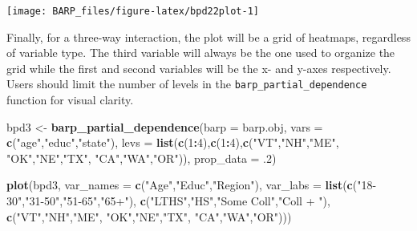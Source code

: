 \documentclass[]{article}
\newenvironment{Shaded}{\begin{snugshade}}{\end{snugshade}}
\newcommand{\KeywordTok}[1]{\textcolor[rgb]{0.13,0.29,0.53}{\textbf{#1}}}
\newcommand{\DataTypeTok}[1]{\textcolor[rgb]{0.13,0.29,0.53}{#1}}
\newcommand{\DecValTok}[1]{\textcolor[rgb]{0.00,0.00,0.81}{#1}}
\newcommand{\StringTok}[1]{\textcolor[rgb]{0.31,0.60,0.02}{#1}}
\newcommand{\OperatorTok}[1]{\textcolor[rgb]{0.81,0.36,0.00}{\textbf{#1}}}
\newcommand{\NormalTok}[1]{#1}
\begin{document}
\begin{center}\texttt{[image: BARP\_files/figure-latex/bpd22plot-1]} \end{center}

Finally, for a three-way interaction, the plot will be a grid of
heatmaps, regardless of variable type. The third variable will always be
the one used to organize the grid while the first and second variables
will be the x- and y-axes respectively. Users should limit the number of
levels in the \texttt{barp\_partial\_dependence} function for visual
clarity.

\begin{Shaded}
\begin{Highlighting}[]
\NormalTok{bpd3 <-}\StringTok{ }\KeywordTok{barp_partial_dependence}\NormalTok{(}\DataTypeTok{barp =}\NormalTok{ barp.obj,}
                               \DataTypeTok{vars =} \KeywordTok{c}\NormalTok{(}\StringTok{"age"}\NormalTok{,}\StringTok{"educ"}\NormalTok{,}\StringTok{"state"}\NormalTok{),}
                               \DataTypeTok{levs =} \KeywordTok{list}\NormalTok{(}\KeywordTok{c}\NormalTok{(}\DecValTok{1}\OperatorTok{:}\DecValTok{4}\NormalTok{),}\KeywordTok{c}\NormalTok{(}\DecValTok{1}\OperatorTok{:}\DecValTok{4}\NormalTok{),}\KeywordTok{c}\NormalTok{(}\StringTok{"VT"}\NormalTok{,}\StringTok{"NH"}\NormalTok{,}\StringTok{"ME"}\NormalTok{,}
                                                           \StringTok{"OK"}\NormalTok{,}\StringTok{"NE"}\NormalTok{,}\StringTok{"TX"}\NormalTok{,}
                                                           \StringTok{"CA"}\NormalTok{,}\StringTok{"WA"}\NormalTok{,}\StringTok{"OR"}\NormalTok{)),}
                               \DataTypeTok{prop_data =}\NormalTok{ .}\DecValTok{2}\NormalTok{)}
\end{Highlighting}
\end{Shaded}

\begin{Shaded}
\begin{Highlighting}[]
\KeywordTok{plot}\NormalTok{(bpd3,}
     \DataTypeTok{var_names =} \KeywordTok{c}\NormalTok{(}\StringTok{"Age"}\NormalTok{,}\StringTok{"Educ"}\NormalTok{,}\StringTok{"Region"}\NormalTok{),}
     \DataTypeTok{var_labs =} \KeywordTok{list}\NormalTok{(}\KeywordTok{c}\NormalTok{(}\StringTok{"18-30"}\NormalTok{,}\StringTok{"31-50"}\NormalTok{,}\StringTok{"51-65"}\NormalTok{,}\StringTok{"65+"}\NormalTok{),}
                     \KeywordTok{c}\NormalTok{(}\StringTok{"LTHS"}\NormalTok{,}\StringTok{"HS"}\NormalTok{,}\StringTok{"Some Coll"}\NormalTok{,}\StringTok{"Coll + "}\NormalTok{),}
                     \KeywordTok{c}\NormalTok{(}\StringTok{"VT"}\NormalTok{,}\StringTok{"NH"}\NormalTok{,}\StringTok{"ME"}\NormalTok{,}
                       \StringTok{"OK"}\NormalTok{,}\StringTok{"NE"}\NormalTok{,}\StringTok{"TX"}\NormalTok{,}
                       \StringTok{"CA"}\NormalTok{,}\StringTok{"WA"}\NormalTok{,}\StringTok{"OR"}\NormalTok{)))}
\end{Highlighting}
\end{Shaded}
\end{document}
